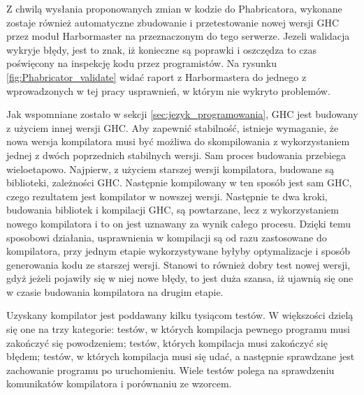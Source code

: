 Z chwilą wysłania proponowanych zmian w kodzie do Phabricatora, wykonane zostaje również automatyczne zbudowanie i przetestowanie nowej wersji GHC przez moduł Harbormaster na przeznaczonym do tego serwerze. Jezeli walidacja wykryje błędy, jest to znak, iż konieczne są poprawki i oszczędza to czas poświęcony na inspekcję kodu przez programistów. Na rysunku \ref{fig:Phabricator_validate} widać raport z Harbormastera do jednego z wprowadzonych w tej pracy usprawnień, w którym nie wykryto problemów.

Jak wspomniane zostało w sekcji \ref{sec:jezyk_programowania}, GHC jest budowany z użyciem innej wersji GHC. Aby zapewnić stabilność, istnieje wymaganie, że nowa wersja kompilatora musi być możliwa do skompilowania z wykorzystaniem jednej z dwóch poprzednich stabilnych wersji\cite{WikiFixingBugs}. Sam proces budowania przebiega wieloetapowo. Najpierw, z użyciem starszej wersji kompilatora, budowane są biblioteki, zależności GHC. Następnie kompilowany w ten sposób jest sam GHC, czego rezultatem jest kompilator w nowszej wersji. Następnie te dwa kroki, budowania bibliotek i kompilacji GHC, są powtarzane, lecz z wykorzystaniem nowego kompilatora i to on jest uznawany za wynik całego procesu\cite{WikiBuildSystem}. Dzięki temu sposobowi działania, usprawnienia w kompilacji są od razu zastosowane do kompilatora, przy jednym etapie wykorzystywane byłyby optymalizacje i sposób generowania kodu ze starszej wersji. Stanowi to również dobry test nowej wersji, gdyż jeżeli pojawiły się w niej nowe błędy, to jest duża szansa, iż ujawnią się one w czasie budowania kompilatora na drugim etapie.

Uzyskany kompilator jest poddawany kilku tysiącom testów. W większości dzielą się one na trzy kategorie: testów, w których kompilacja pewnego programu musi zakończyć się powodzeniem; testów, których kompilacja musi zakończyć się błędem; testów, w których kompilacja musi się udać, a następnie sprawdzane jest zachowanie programu po uruchomieniu. Wiele testów polega na sprawdzeniu komunikatów kompilatora i porównaniu ze wzorcem.
